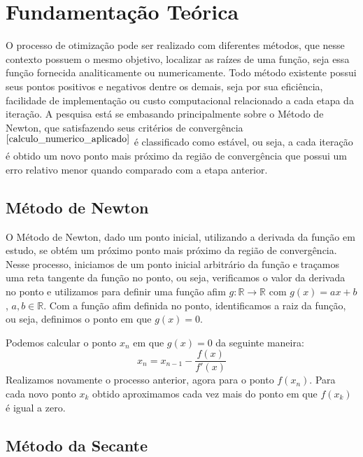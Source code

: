 \section{Fundamentação Teórica}
\label{sec:teorical-base}
  O processo de otimização pode ser realizado com diferentes métodos, que nesse contexto possuem o mesmo objetivo, localizar as raízes de uma função, seja essa função fornecida analiticamente ou numericamente. Todo método existente possui seus pontos positivos e negativos dentre os demais, seja por sua eficiência, facilidade de implementação ou custo computacional relacionado a cada etapa da iteração. A pesquisa está se embasando principalmente sobre o Método de Newton, que satisfazendo seus critérios de convergência$^{ \cite{calculo_numerico_aplicado} }$ é classificado como estável, ou seja, a cada iteração é obtido um novo ponto mais próximo da região de convergência que possui um erro relativo menor quando comparado com a etapa anterior.

\subsection{Método de Newton}
\label{sec:newton-method}

O Método de Newton, dado um ponto inicial, utilizando a derivada da função em estudo, se obtém um próximo ponto mais próximo da região de convergência. Nesse processo, iniciamos de um ponto inicial arbitrário da função e traçamos uma reta tangente da função no ponto, ou seja, verificamos o valor da derivada no ponto e utilizamos para definir uma função afim $g: {\mathds{R}\to\mathds{R}}$ com $g(x) = ax + b$, $a, b \in \mathds{R}$. Com a função afim definida no ponto, identificamos a raiz da função, ou seja, definimos o ponto em que $g(x)=0$.

Podemos calcular o ponto $x_n$ em que $g(x) = 0$ da seguinte maneira:
%
\begin{equation}
  x_n = x_{n-1} - \frac{f(x)}{f'(x)}
\end{equation}
%
Realizamos novamente o processo anterior, agora para o ponto $f(x_n)$. Para cada novo ponto $x_k$ obtido aproximamos cada vez mais do ponto em que $f(x_k)$ é igual a zero.


\subsection{Método da Secante}

